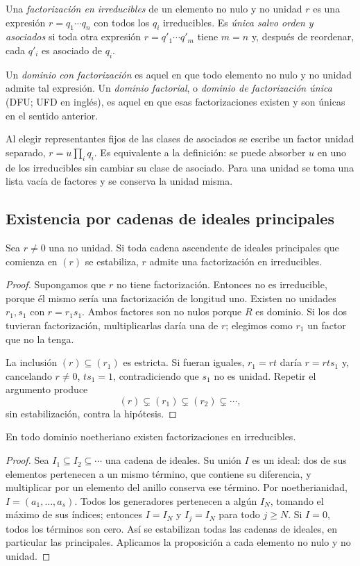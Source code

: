 \begin{defi}
Una \emph{factorización en irreducibles} de un elemento no nulo y no unidad $r$ es una expresión $r=q_1\cdots q_n$ con todos los $q_i$ irreducibles. Es \emph{única salvo orden y asociados} si toda otra expresión $r=q'_1\cdots q'_m$ tiene $m=n$ y, después de reordenar, cada $q'_i$ es asociado de $q_i$.

Un \emph{dominio con factorización} es aquel en que todo elemento no nulo y no unidad admite tal expresión. Un \emph{dominio factorial}, o \emph{dominio de factorización única} (DFU; UFD en inglés), es aquel en que esas factorizaciones existen y son únicas en el sentido anterior.
\end{defi}
Al elegir representantes fijos de las clases de asociados se escribe un factor unidad separado, $r=u\prod_i q_i$. Es equivalente a la definición: se puede absorber $u$ en uno de los irreducibles sin cambiar su clase de asociado. Para una unidad se toma una lista vacía de factores y se conserva la unidad misma.

\subsection{Existencia por cadenas de ideales principales}\label{tema:16-1-2a}
\begin{prop}\label{prop:C16-existencia}
Sea $r\ne0$ una no unidad. Si toda cadena ascendente de ideales principales que comienza en $(r)$ se estabiliza, $r$ admite una factorización en irreducibles.
\end{prop}
\begin{proof}
Supongamos que $r$ no tiene factorización. Entonces no es irreducible, porque él mismo sería una factorización de longitud uno. Existen no unidades $r_1,s_1$ con $r=r_1s_1$. Ambos factores son no nulos porque $R$ es dominio. Si los dos tuvieran factorización, multiplicarlas daría una de $r$; elegimos como $r_1$ un factor que no la tenga.

La inclusión $(r)\subseteq(r_1)$ es estricta. Si fueran iguales, $r_1=rt$ daría $r=rts_1$ y, cancelando $r\ne0$, $ts_1=1$, contradiciendo que $s_1$ no es unidad. Repetir el argumento produce
\[
(r)\subsetneq(r_1)\subsetneq(r_2)\subsetneq\cdots,
\]
sin estabilización, contra la hipótesis.
\end{proof}

\begin{coro}\label{coro:C16-noetheriano}
En todo dominio noetheriano existen factorizaciones en irreducibles.
\end{coro}
\begin{proof}
Sea $I_1\subseteq I_2\subseteq\cdots$ una cadena de ideales. Su unión $I$ es un ideal: dos de sus elementos pertenecen a un mismo término, que contiene su diferencia, y multiplicar por un elemento del anillo conserva ese término. Por noetherianidad, $I=(a_1,\ldots,a_s)$. Todos los generadores pertenecen a algún $I_N$, tomando el máximo de sus índices; entonces $I=I_N$ y $I_j=I_N$ para todo $j\ge N$. Si $I=0$, todos los términos son cero. Así se estabilizan todas las cadenas de ideales, en particular las principales. Aplicamos la proposición a cada elemento no nulo y no unidad.
\end{proof}

